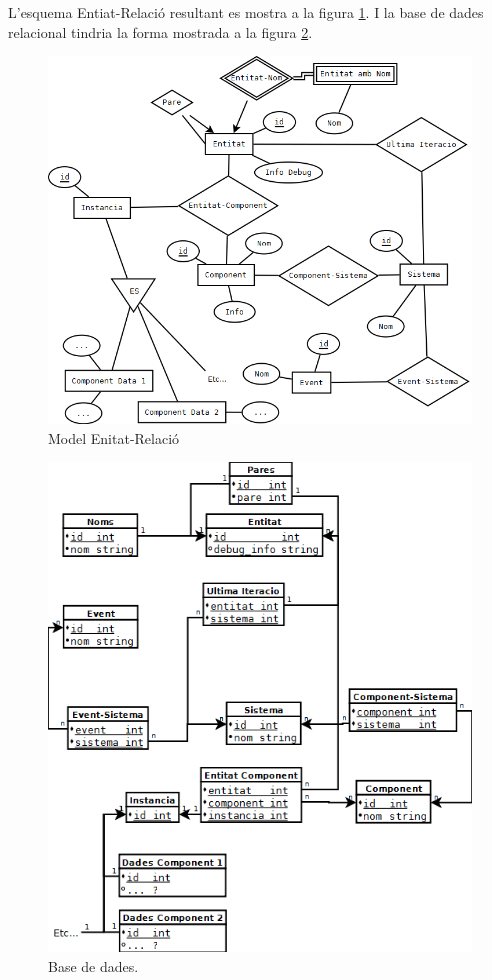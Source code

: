   L'esquema Entiat-Relació resultant es mostra a la figura \ref{fig:EntitatRelacio}. I la base de dades relacional tindria la forma mostrada a la figura \ref{fig:BBDDRelacional}.

  \begin{figure}
    \includegraphics[width=1\linewidth]{./img/EntitatRelacio.png}
    \caption{Model Enitat-Relació \label{fig:EntitatRelacio}}
  \end{figure}

  \begin{figure}
    \includegraphics[width=1\linewidth]{./img/BBDDRelacional.png}
    \caption{Base de dades. \label{fig:BBDDRelacional}}
  \end{figure}
  
